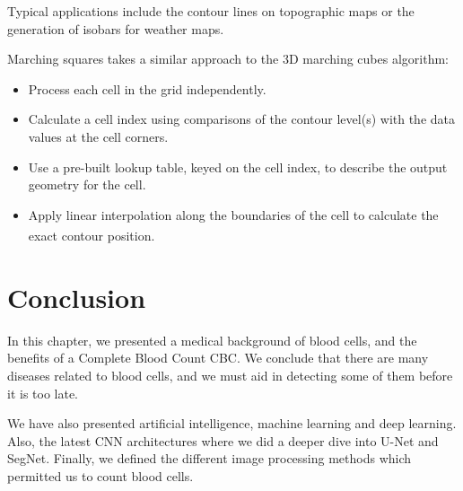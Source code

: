 Typical applications include the contour lines on topographic maps or the generation of isobars for weather maps.

Marching squares takes a similar approach to the 3D marching cubes algorithm:

\begin{itemize}
    \item Process each cell in the grid independently.
    \item Calculate a cell index using comparisons of the contour level(s) with the data values at the cell corners.
    \item Use a pre-built lookup table, keyed on the cell index, to describe the output geometry for the cell.
    \item Apply linear interpolation along the boundaries of the cell to calculate the exact contour position. \textsuperscript{\cite{maple2003geometric}}
\end{itemize}


\section{Conclusion}
\hspace{\parindent}
In this chapter, we presented a medical background of blood cells, and the benefits of a Complete Blood Count CBC.
We conclude that there are many diseases related to blood cells, and we must aid in detecting some of them before it is too late.

We have also presented artificial intelligence, machine learning and deep learning. Also, the latest CNN architectures where we did a deeper dive into U-Net and SegNet.
Finally, we defined the different image processing methods which permitted us to count blood cells.
